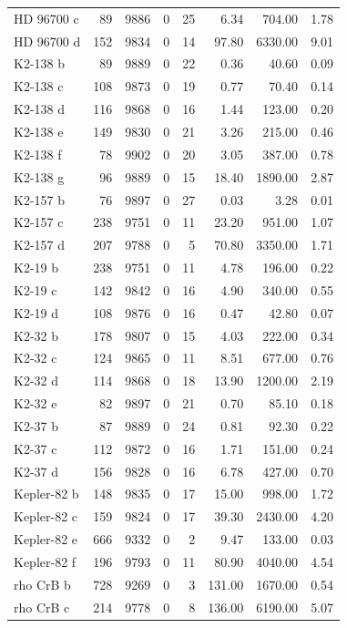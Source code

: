 \begin{table}
\begin{tabular}{lrrrrrrr}
HD 96700 c & 89 & 9886 & 0 & 25 & 6.34 & 704.00 & 1.78 \\
HD 96700 d & 152 & 9834 & 0 & 14 & 97.80 & 6330.00 & 9.01 \\
K2-138 b & 89 & 9889 & 0 & 22 & 0.36 & 40.60 & 0.09 \\
K2-138 c & 108 & 9873 & 0 & 19 & 0.77 & 70.40 & 0.14 \\
K2-138 d & 116 & 9868 & 0 & 16 & 1.44 & 123.00 & 0.20 \\
K2-138 e & 149 & 9830 & 0 & 21 & 3.26 & 215.00 & 0.46 \\
K2-138 f & 78 & 9902 & 0 & 20 & 3.05 & 387.00 & 0.78 \\
K2-138 g & 96 & 9889 & 0 & 15 & 18.40 & 1890.00 & 2.87 \\
K2-157 b & 76 & 9897 & 0 & 27 & 0.03 & 3.28 & 0.01 \\
K2-157 c & 238 & 9751 & 0 & 11 & 23.20 & 951.00 & 1.07 \\
K2-157 d & 207 & 9788 & 0 & 5 & 70.80 & 3350.00 & 1.71 \\
K2-19 b & 238 & 9751 & 0 & 11 & 4.78 & 196.00 & 0.22 \\
K2-19 c & 142 & 9842 & 0 & 16 & 4.90 & 340.00 & 0.55 \\
K2-19 d & 108 & 9876 & 0 & 16 & 0.47 & 42.80 & 0.07 \\
K2-32 b & 178 & 9807 & 0 & 15 & 4.03 & 222.00 & 0.34 \\
K2-32 c & 124 & 9865 & 0 & 11 & 8.51 & 677.00 & 0.76 \\
K2-32 d & 114 & 9868 & 0 & 18 & 13.90 & 1200.00 & 2.19 \\
K2-32 e & 82 & 9897 & 0 & 21 & 0.70 & 85.10 & 0.18 \\
K2-37 b & 87 & 9889 & 0 & 24 & 0.81 & 92.30 & 0.22 \\
K2-37 c & 112 & 9872 & 0 & 16 & 1.71 & 151.00 & 0.24 \\
K2-37 d & 156 & 9828 & 0 & 16 & 6.78 & 427.00 & 0.70 \\
Kepler-82 b & 148 & 9835 & 0 & 17 & 15.00 & 998.00 & 1.72 \\
Kepler-82 c & 159 & 9824 & 0 & 17 & 39.30 & 2430.00 & 4.20 \\
Kepler-82 e & 666 & 9332 & 0 & 2 & 9.47 & 133.00 & 0.03 \\
Kepler-82 f & 196 & 9793 & 0 & 11 & 80.90 & 4040.00 & 4.54 \\
rho CrB b & 728 & 9269 & 0 & 3 & 131.00 & 1670.00 & 0.54 \\
rho CrB c & 214 & 9778 & 0 & 8 & 136.00 & 6190.00 & 5.07 \\

\end{tabular}
\end{table}
